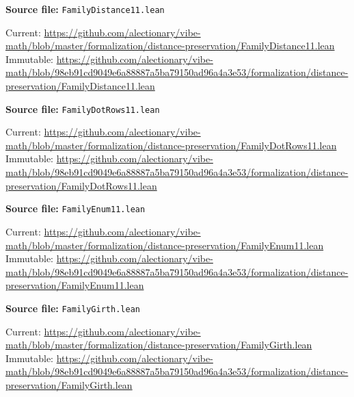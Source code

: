 \par\smallskip\noindent\begin{minipage}{\linewidth}\small\setlength{\baselineskip}{11pt}
\textbf{Source file:} \nolinkurl{FamilyDistance11.lean}\par\nopagebreak
Current: \url{https://github.com/alectionary/vibe-math/blob/master/formalization/distance-preservation/FamilyDistance11.lean}\\
Immutable: \url{https://github.com/alectionary/vibe-math/blob/98eb91cd9049e6a88887a5ba79150ad96a4a3e53/formalization/distance-preservation/FamilyDistance11.lean}\par\end{minipage}\par
\par\smallskip\noindent\begin{minipage}{\linewidth}\small\setlength{\baselineskip}{11pt}
\textbf{Source file:} \nolinkurl{FamilyDotRows11.lean}\par\nopagebreak
Current: \url{https://github.com/alectionary/vibe-math/blob/master/formalization/distance-preservation/FamilyDotRows11.lean}\\
Immutable: \url{https://github.com/alectionary/vibe-math/blob/98eb91cd9049e6a88887a5ba79150ad96a4a3e53/formalization/distance-preservation/FamilyDotRows11.lean}\par\end{minipage}\par
\par\smallskip\noindent\begin{minipage}{\linewidth}\small\setlength{\baselineskip}{11pt}
\textbf{Source file:} \nolinkurl{FamilyEnum11.lean}\par\nopagebreak
Current: \url{https://github.com/alectionary/vibe-math/blob/master/formalization/distance-preservation/FamilyEnum11.lean}\\
Immutable: \url{https://github.com/alectionary/vibe-math/blob/98eb91cd9049e6a88887a5ba79150ad96a4a3e53/formalization/distance-preservation/FamilyEnum11.lean}\par\end{minipage}\par
\par\smallskip\noindent\begin{minipage}{\linewidth}\small\setlength{\baselineskip}{11pt}
\textbf{Source file:} \nolinkurl{FamilyGirth.lean}\par\nopagebreak
Current: \url{https://github.com/alectionary/vibe-math/blob/master/formalization/distance-preservation/FamilyGirth.lean}\\
Immutable: \url{https://github.com/alectionary/vibe-math/blob/98eb91cd9049e6a88887a5ba79150ad96a4a3e53/formalization/distance-preservation/FamilyGirth.lean}\par\end{minipage}\par
